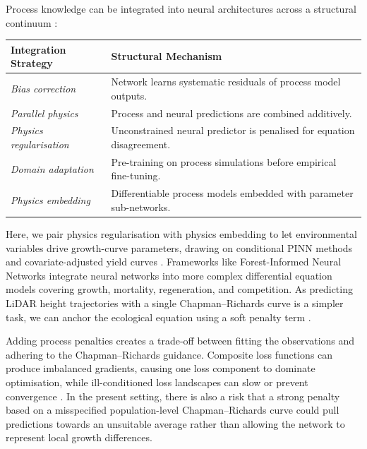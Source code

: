 Process knowledge can be integrated into neural architectures across a structural continuum \citep{wesselkamp2024Process_C4_NN}:
\begin{table}[ht]
\centering
\scriptsize
\begin{tabular}{ll}
\hline
\textbf{Integration Strategy} & \textbf{Structural Mechanism} \\
\hline
\emph{Bias correction} & Network learns systematic residuals of process model outputs. \\
\emph{Parallel physics} & Process and neural predictions are combined additively. \\
\emph{Physics regularisation} & Unconstrained neural predictor is penalised for equation disagreement. \\
\emph{Domain adaptation} & Pre-training on process simulations before empirical fine-tuning. \\
\emph{Physics embedding} & Differentiable process models embedded with parameter sub-networks. \\
\hline
\end{tabular}
\label{tab:pinn-strategies}
\end{table}
Here, we pair physics regularisation with physics embedding to let environmental variables drive growth-curve parameters, drawing on conditional PINN methods \cite{kovacs2022Conditional_C4_NN,miao2023VCPINN_C4_NN} and covariate-adjusted yield curves \cite{scolforo2013Dominant_C2_CR}. Frameworks like Forest-Informed Neural Networks integrate neural networks into more complex differential equation models covering growth, mortality, regeneration, and competition. As predicting LiDAR height trajectories with a single Chapman--Richards curve is a simpler task, we can anchor the ecological equation using a soft penalty term \citep{pichler2025Inferring_C4_NN}.

Adding process penalties creates a trade-off between fitting the observations and adhering to the Chapman--Richards guidance. Composite loss functions can produce imbalanced gradients, causing one loss component to dominate optimisation, while ill-conditioned loss landscapes can slow or prevent convergence \cite{wang2021Understanding_C4_NN,rathore2024Challenges_C4_NN}. In the present setting, there is also a risk that a strong penalty based on a misspecified population-level Chapman--Richards curve could pull predictions towards an unsuitable average rather than allowing the network to represent local growth differences.

